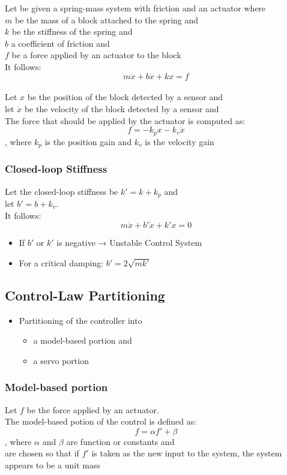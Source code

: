 \documentclass[10pt,a4paper]{article}
\begin{document}
Let be given a spring-mass system with friction and an actuator where \\
$m$ be the mass of a block attached to the spring and \\
$k$ be the stiffness of the spring and \\
$b$ a coefficient of friction and \\
$f$ be a force applied by an actuator to the block \\
It follows:
$$
m\ddot x + b \dot x + k x = f
$$
\\

Let $x$ be the position of the block detected by a sensor and \\
let $\dot x$ be the velocity of the block detected by a sensor and \\
The force that should be applied by the actuator is computed as:
$$
	f = -k_px - k_v \dot x
$$
, where $k_p$ is the position gain and $k_v$ is the velocity gain

\subsubsection{Closed-loop Stiffness}
Let the closed-loop stiffness be $k' = k + k_p$ and \\
let $b' = b + k_v$. \\
It follows:
$$
	m\ddot x + b' \dot x + k' x = 0
$$

\begin{itemize}
	\item If $b'$ or $k'$ is negative → Unstable Control System
	\item For a critical damping: $b' = 2\sqrt{mk'}$
\end{itemize}

\subsection{Control-Law Partitioning}
\begin{itemize}
	\item Partitioning of the controller into
	\begin{itemize}
		\item a model-based portion and
		\item a servo portion
	\end{itemize}
\end{itemize}

\subsubsection{Model-based portion}
Let $f$ be the force applied by an actuator. \\
The model-based potion of the control is defined as:
$$
	f = \alpha f' + \beta
$$
, where $\alpha$ and $\beta$ are function or constants and \\
are chosen so that if $f'$ is taken as the new input to the system, the system appears to be a unit mass
\end{document}
